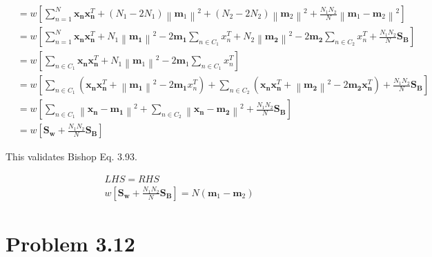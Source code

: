 \documentclass[12pt, letterpaper]{article}
\begin{document}
\begin{equation}
\begin{aligned}
&=w [\sum_{n=1}^{N} \mathbf{x}_{\mathbf{n}} \mathbf{x}_{\mathbf{n}}^{T}+\left(N_{1}-2 N_{1}\right)\left\|\mathbf{m}_{1}\right\|^{2}+\left(N_{2}-2 N_{2}\right)\left\|\mathbf{m}_{2}\right\|^{2}+\frac{N_{1} N_{2}}{N}\left\|\mathbf{m}_{1}-\mathbf{m}_{2}\right\|^{2} ]\\
&=w [ \sum_{n=1}^{N} \mathbf{x}_{\mathbf{n}} \mathbf{x}_{\mathbf{n}}^{T}+N_{1}\left\|\mathbf{m}_{\mathbf{1}}\right\|^{2}-2 \mathbf{m}_{\mathbf{1}} \sum_{n \in C_{1}} x_{n}^{T}+N_{2}\left\|\mathbf{m}_{\mathbf{2}}\right\|^{2}-2 \mathbf{m}_{\mathbf{2}} \sum_{n \in C_{2}} x_{n}^{T}+\frac{N_{1} N_{2}}{N} \mathbf{S}_{\mathbf{B}} ]\\
&=w [\sum_{n \in C_{1}} \mathbf{x}_{\mathbf{n}} \mathbf{x}_{\mathbf{n}}^{T}+N_{1}\left\|\mathbf{m}_{1}\right\|^{2}-2 \mathbf{m}_{1} \sum_{n \in C_{1}} x_{n}^{T} ]\\
&=w [\sum_{n \in C_{1}}\left(\mathbf{x}_{\mathbf{n}} \mathbf{x}_{\mathbf{n}}^{T}+\left\|\mathbf{m}_{\mathbf{1}}\right\|^{2}-2 \mathbf{m}_{\mathbf{1}} x_{n}^{T}\right)+\sum_{n \in C_{2}}\left(\mathbf{x}_{\mathbf{n}} \mathbf{x}_{\mathbf{n}}^{T}+\left\|\mathbf{m}_{\mathbf{2}}\right\|^{2}-2 \mathbf{m}_{\mathbf{2}} \mathbf{x}_{\mathbf{n}}^{T}\right)+\frac{N_{1} N_{2}}{N} \mathbf{S}_{\mathbf{B}} ]\\
&=w[\sum_{n \in C_{1}}\left\|\mathbf{x}_{\mathbf{n}}-\mathbf{m}_{\mathbf{1}}\right\|^{2}+\sum_{n \in C_{2}}\left\|\mathbf{x}_{\mathbf{n}}-\mathbf{m}_{\mathbf{2}}\right\|^{2}+\frac{N_{1} N_{2}}{N} \mathbf{S}_{\mathbf{B}}]\\
&=w[\mathbf{S}_{\mathbf{w}}+\frac{N_{1} N_{2}}{N} \mathbf{S}_{\mathbf{B}}]
\end{aligned}
\end{equation}

This validates Bishop Eq. 3.93. 

\begin{equation}
\begin{aligned}
LHS = RHS \\
w[\mathbf{S}_{\mathbf{w}}+\frac{N_{1} N_{2}}{N} \mathbf{S}_{\mathbf{B}}] = N\left(\mathbf{m}_{1}-\mathbf{m}_{2}\right)
\end{aligned}
\end{equation}

\section*{Problem 3.12}
\end{document}
